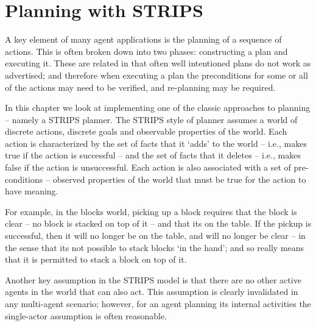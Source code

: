 \chapter{Planning with STRIPS}
\label{strips}

A key element of many agent applications is the planning of a sequence of actions. This is often broken down into two phases: constructing a plan and executing it. These are related in that often well intentioned plans do not work as advertised; and therefore when executing a plan the preconditions for some or all of the actions may need to be verified, and re-planning may be required. 

In this chapter we look at implementing one of the classic approaches to planning -- namely a STRIPS planner. The STRIPS style of planner assumes a world of discrete actions, discrete goals and observable properties of the world. Each action is characterized by the set of facts that it `adds' to the world -- i.e., makes true if the action is successful -- and the set of facts that it deletes -- i.e., makes false if the action is unsuccessful. Each action is also associated with a set of pre-conditions -- observed properties of the world that must be true for the action to have meaning.

For example, in the blocks world, picking up a block requires that the block is clear -- no block is stacked on top of it -- and that its on the table. If the pickup is successful, then it will no longer be on the table, and will no longer be clear -- in the sense that its not possible to stack blocks `in the hand'; and so  really means that it is permitted to stack a block on top of it.
\begin{aside}
Another key assumption in the STRIPS model is that there are no other active agents in the world that can also act. This assumption is clearly invalidated in any multi-agent scenario; however, for an agent planning its internal activities the single-actor assumption is often reasonable.
\end{aside}

